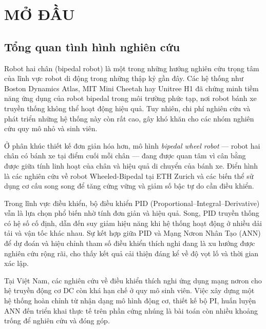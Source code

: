 
\chapter{MỞ ĐẦU}
\label{chap:modau}

\section{Tổng quan tình hình nghiên cứu}

Robot hai chân (bipedal robot) là một trong những hướng nghiên cứu trọng tâm của
lĩnh vực robot di động trong những thập kỷ gần đây. Các hệ thống như Boston Dynamics
Atlas, MIT Mini Cheetah hay Unitree H1 đã chứng minh tiềm năng ứng dụng của robot
bipedal trong môi trường phức tạp, nơi robot bánh xe truyền thống không thể hoạt động
hiệu quả. Tuy nhiên, chi phí nghiên cứu và phát triển những hệ thống này còn rất cao,
gây khó khăn cho các nhóm nghiên cứu quy mô nhỏ và sinh viên.

Ở phân khúc thiết kế đơn giản hóa hơn, mô hình \textit{bipedal wheel robot} —
robot hai chân có bánh xe tại điểm cuối mỗi chân — đang được quan tâm vì cân bằng
được giữa tính linh hoạt của chân và hiệu quả di chuyển của bánh xe. Điển hình là các
nghiên cứu về robot Wheeled-Bipedal tại ETH Zurich và các biến thể sử dụng cơ cấu
song song để tăng cứng vững và giảm số bậc tự do cần điều khiển.

Trong lĩnh vực điều khiển, bộ điều khiển PID (Proportional–Integral–Derivative)
vẫn là lựa chọn phổ biến nhờ tính đơn giản và hiệu quả. Song, PID truyền thống có hệ
số cố định, dẫn đến suy giảm hiệu năng khi hệ thống hoạt động ở nhiều dải tải và vận
tốc khác nhau. Sự kết hợp giữa PID và Mạng Nơron Nhân Tạo (ANN) để dự đoán và
hiệu chỉnh tham số điều khiển thích nghi đang là xu hướng được nghiên cứu rộng rãi,
cho thấy kết quả cải thiện đáng kể về độ vọt lố và thời gian xác lập.

Tại Việt Nam, các nghiên cứu về điều khiển thích nghi ứng dụng mạng nơron cho
hệ truyền động cơ DC còn khá hạn chế ở quy mô sinh viên. Việc xây dựng một hệ
thống hoàn chỉnh từ nhận dạng mô hình động cơ, thiết kế bộ PI, huấn luyện ANN đến
triển khai thực tế trên phần cứng nhúng là bài toán còn nhiều khoảng trống để nghiên cứu
và đóng góp.

